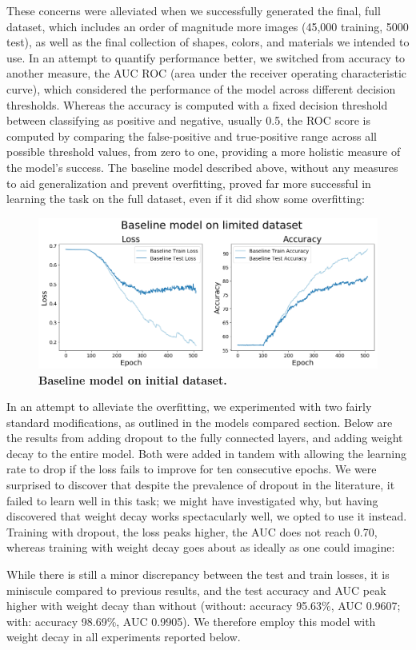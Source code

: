 These concerns were alleviated when we successfully generated the final, full dataset, which includes an order of magnitude more images (45,000 training, 5000 test), as well as the final collection of shapes, colors, and materials we intended to use. In an attempt to quantify performance better, we switched from accuracy to another measure, the AUC ROC (area under the receiver operating characteristic curve), which considered the performance of the model across different decision thresholds. Whereas the accuracy is computed with a fixed decision threshold between classifying as positive and negative, usually 0.5, the ROC score is computed by comparing the false-positive and true-positive range across all possible threshold values, from zero to one, providing a more holistic measure of the model’s success. The baseline model described above, without any measures to aid generalization and prevent overfitting, proved far more successful in learning the task on the full dataset, even if it did show some overfitting:

\begin{figure}[!htb]
\centering
\includegraphics[width=\linewidth]{ch-results/figures/baseline/limited_dataset.png}
\caption{{\bf Baseline model on initial dataset.} }
\label{fig:results-baseline-limited-dataset}
\end{figure}

In an attempt to alleviate the overfitting, we experimented with two fairly standard modifications, as outlined in the models compared section. Below are the results from adding dropout to the fully connected layers, and adding weight decay to the entire model. Both were added in tandem with allowing the learning rate to drop if the loss fails to improve for ten consecutive epochs. We were surprised to discover that despite the prevalence of dropout in the literature, it failed to learn well in this task; we might have investigated why, but having discovered that weight decay works spectacularly well, we opted to use it instead. Training with dropout, the loss peaks higher, the AUC does not reach 0.70, whereas training with weight decay goes about as ideally as one could imagine:

While there is still a minor discrepancy between the test and train losses, it is miniscule compared to previous results, and the test accuracy and AUC peak higher with weight decay than without (without: accuracy 95.63\%, AUC 0.9607; with: accuracy 98.69\%, AUC 0.9905). We therefore employ this model with weight decay in all experiments reported below.
